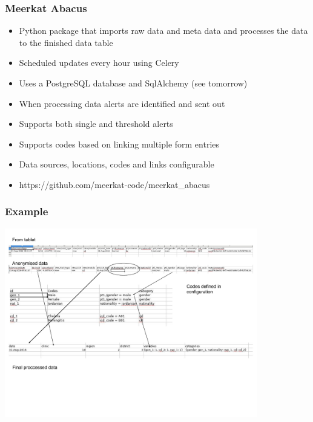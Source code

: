 \documentclass{beamer}
\begin{document}
\begin{frame}
  \frametitle{Meerkat Abacus}
  \begin{itemize}
  \item Python package that imports raw data and meta data and processes the data to the finished data table
  \item Scheduled updates every hour using Celery
  \item Uses a PostgreSQL database and SqlAlchemy (see tomorrow)
  \item When processing data alerts are identified and sent out
  \item Supports both single and threshold alerts
  \item Supports codes based on linking multiple form entries
  \item Data sources, locations, codes and links configurable
  \item https://github.com/meerkat-code/meerkat\_abacus
  \end{itemize}

\end{frame}

\begin{frame}
   \frametitle{Example}
  \begin{center}
    \includegraphics[width=11cm]{ex.pdf}
  \end{center}

\end{frame}
\end{document}
